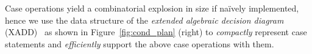 \documentclass{article} %
\begin{document}

Case operations yield a combinatorial explosion in size if
na\"{i}vely implemented, hence 
we use the data structure of the \emph{extended algebraic
  decision diagram} (XADD)~\cite{sanner_uai11} as shown in
Figure~\ref{fig:cond_plan} (right) to \emph{compactly} 
represent case statements and \emph{efficiently} support the above
case operations with them.

\end{document}

